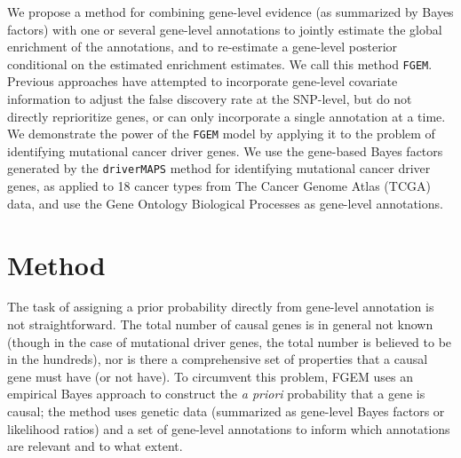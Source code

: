We propose a method for combining gene-level evidence (as summarized by Bayes factors) with one or several gene-level annotations to jointly estimate the global enrichment of the annotations, and to re-estimate a gene-level posterior
conditional on the estimated enrichment estimates. We call this method \texttt{FGEM}.  Previous approaches have attempted to incorporate gene-level covariate information to adjust the false discovery rate at the
SNP-level\cite{Zablocki_2014}, but do not directly reprioritize genes, or can only incorporate a single annotation at a time\cite{rss-e}.  We demonstrate the power of the \texttt{FGEM} model by applying it to the problem of
identifying mutational cancer driver genes. We use the gene-based Bayes factors generated by the \texttt{driverMAPS} method for identifying mutational cancer driver genes, as applied to 18 cancer types from The Cancer Genome Atlas
(TCGA) data\cite{TCGA}\cite{drivermaps}, and use the Gene Ontology Biological Processes as gene-level annotations.


\section{Method}\label{sec:org4822ac5}

The task of assigning a prior probability directly from gene-level annotation is not straightforward.  The total number of causal genes is in general not known (though in the case of mutational driver genes, the total number is believed to be in the hundreds\cite{Bailey_2018}), nor is there a comprehensive set of properties that a causal gene must have (or not have).  To circumvent this problem, FGEM uses an empirical Bayes approach to construct the \emph{a priori} probability that a gene is causal; the method uses genetic data (summarized as gene-level Bayes factors or likelihood ratios) and a set of gene-level annotations to inform which annotations are relevant and to what extent.
